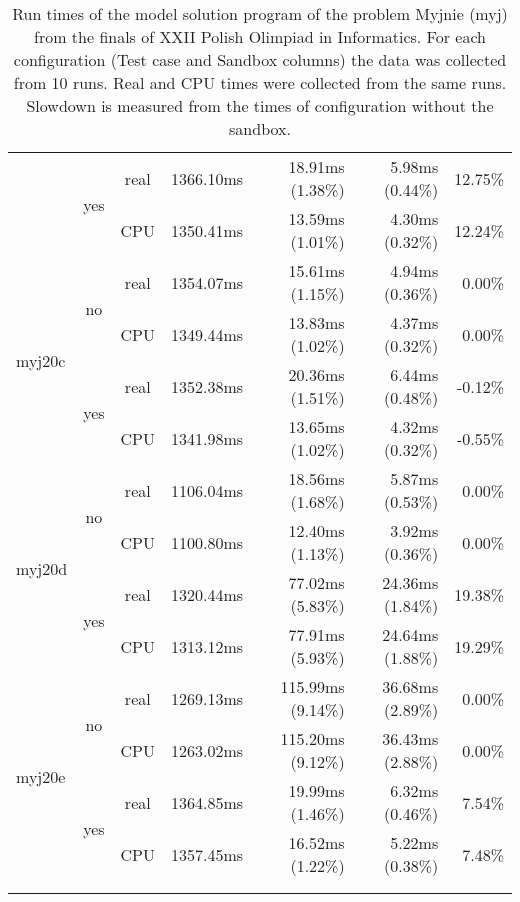 \documentclass[en]{pracamgr}
\begin{document}
\begin{appendices}
\begin{small}
\begin{longtable}{|l|c|c|r|r|r|r|}
                          \cline{2-7}
                          & \multirow{2}{*}{yes} & real & 1366.10ms & 18.91ms (1.38\%) & 5.98ms (0.44\%) & 12.75\% \\*
                          &                      & CPU  & 1350.41ms & 13.59ms (1.01\%) & 4.30ms (0.32\%) & 12.24\% \\
\hline
\multirow{4}{*}{myj20c}   & \multirow{2}{*}{no}  & real & 1354.07ms & 15.61ms (1.15\%) & 4.94ms (0.36\%) & 0.00\% \\*
                          &                      & CPU  & 1349.44ms & 13.83ms (1.02\%) & 4.37ms (0.32\%) & 0.00\% \\*
                          \cline{2-7}
                          & \multirow{2}{*}{yes} & real & 1352.38ms & 20.36ms (1.51\%) & 6.44ms (0.48\%) & -0.12\% \\*
                          &                      & CPU  & 1341.98ms & 13.65ms (1.02\%) & 4.32ms (0.32\%) & -0.55\% \\
\hline
\multirow{4}{*}{myj20d}   & \multirow{2}{*}{no}  & real & 1106.04ms & 18.56ms (1.68\%) & 5.87ms (0.53\%) & 0.00\% \\*
                          &                      & CPU  & 1100.80ms & 12.40ms (1.13\%) & 3.92ms (0.36\%) & 0.00\% \\*
                          \cline{2-7}
                          & \multirow{2}{*}{yes} & real & 1320.44ms & 77.02ms (5.83\%) & 24.36ms (1.84\%) & 19.38\% \\*
                          &                      & CPU  & 1313.12ms & 77.91ms (5.93\%) & 24.64ms (1.88\%) & 19.29\% \\
\hline
\multirow{4}{*}{myj20e}   & \multirow{2}{*}{no}  & real & 1269.13ms & 115.99ms (9.14\%) & 36.68ms (2.89\%) & 0.00\% \\*
                          &                      & CPU  & 1263.02ms & 115.20ms (9.12\%) & 36.43ms (2.88\%) & 0.00\% \\*
                          \cline{2-7}
                          & \multirow{2}{*}{yes} & real & 1364.85ms & 19.99ms (1.46\%) & 6.32ms (0.46\%) & 7.54\% \\*
                          &                      & CPU  & 1357.45ms & 16.52ms (1.22\%) & 5.22ms (0.38\%) & 7.48\% \\
\hline
\multicolumn{1}{c}{}\\ %
\caption{Run times of the model solution program of the problem Myjnie (myj) from the finals of XXII Polish Olimpiad in Informatics. For each configuration (Test case and Sandbox columns) the data was collected from 10 runs. Real and CPU times were collected from the same runs. Slowdown is measured from the times of configuration without the sandbox.}
\label{table:myj_model_solution_runtimes}
\end{longtable}
\end{small}


\end{appendices}
\end{document}
